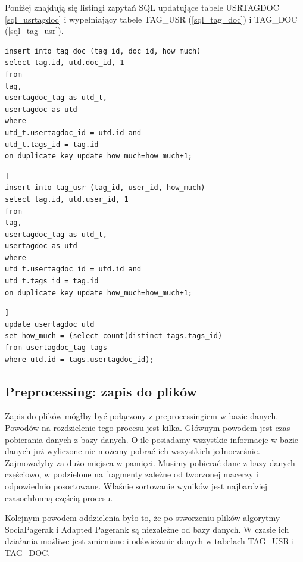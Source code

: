 \documentclass[11pt,a4paper]{report}
\begin{document}
Poniżej znajdują się listingi zapytań SQL updatujące tabele USRTAGDOC \ref{sql_usrtagdoc} i wypełniający tabele TAG\_USR (\ref{sql_tag_doc}) i TAG\_DOC (\ref{sql_tag_usr}). 


\lstset{language=SQL}   
\begin{lstlisting}[frame=lines, caption={Skrypt dodający dane do tabeli tag\_doc}, label={sql_tag_doc}]
insert into tag_doc (tag_id, doc_id, how_much)
select tag.id, utd.doc_id, 1
from
tag,
usertagdoc_tag as utd_t,
usertagdoc as utd
where
utd_t.usertagdoc_id = utd.id and
utd_t.tags_id = tag.id
on duplicate key update how_much=how_much+1;
\end{lstlisting}

\begin{lstlisting}[frame=lines, caption={Skrypt dodający dane do tabeli tag\_usr}, label={sql_tag_usr}]]
insert into tag_usr (tag_id, user_id, how_much)
select tag.id, utd.user_id, 1
from
tag,
usertagdoc_tag as utd_t,
usertagdoc as utd
where
utd_t.usertagdoc_id = utd.id and
utd_t.tags_id = tag.id
on duplicate key update how_much=how_much+1;
\end{lstlisting}

\begin{lstlisting}[frame=lines, caption={Skrypt updatujący pole how\_much w tabeli usertagdoc}, label={sql_usrtagdoc}] ]
update usertagdoc utd
set how_much = (select count(distinct tags.tags_id)
from usertagdoc_tag tags
where utd.id = tags.usertagdoc_id);
\end{lstlisting}


\subsection{Preprocessing: zapis do plików}
Zapis do plików mógłby być połączony z preprocessingiem w bazie danych. Powodów na rozdzielenie tego procesu jest kilka. Głównym powodem jest czas pobierania danych z bazy danych. O ile posiadamy wszystkie informacje w bazie danych już wyliczone nie możemy pobrać ich wszystkich jednocześnie. Zajmowałyby za dużo miejsca w pamięci. Musimy pobierać dane z bazy danych częściowo, w podzielone na fragmenty zależne od tworzonej macerzy i odpowiednio posortowane. Właśnie sortowanie wyników jest najbardziej czasochłonną częścią procesu.

Kolejnym powodem oddzielenia było to, że po stworzeniu plików algorytmy SociaPagerak i Adapted Pagerank są niezależne od bazy danych. W czasie ich działania możliwe jest zmieniane i odświeżanie danych w tabelach TAG\_USR i TAG\_DOC. 
\end{document}
